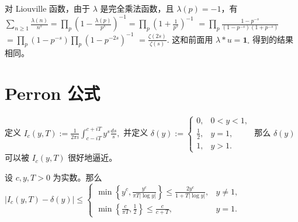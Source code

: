 \begin{example}
	对 Liouville 函数，由于 $\lambda$ 是完全乘法函数，且 $\lambda(p)=-1$，有
	\(\textstyle \sum_{n\geq\allowbreak{} 1}\frac{\lambda(n)}{n^s} =\allowbreak{} \prod_p\left(1-\frac{\lambda(p)}{p^s}\right)^{-1} =\allowbreak{} \prod_p\left(1+\allowbreak{}\frac1{p^s}\right)^{-1}\) \(\textstyle =\allowbreak{} \prod_p \frac{1-p^{-s}}{(1-p^{-s})(1+\allowbreak{}p^{-s})}\) \(\textstyle =\allowbreak{} \prod_p(1-p^{-s})\prod_p(1-p^{-2s})^{-1}\) \(\textstyle =\allowbreak{} \frac{\zeta(2s)}{\zeta(s)}.\)
	这和前面用 $\lambda*u=\mathbf 1_{\square}$ 得到的结果相同。
\end{example}

\section{Perron 公式}

定义
\(\textstyle I_c(y,\allowbreak{}T):=\allowbreak{} \frac1{2\pi i}\int_{c-iT}^{c+\allowbreak{}iT}y^s\frac{ds}{s},\allowbreak{}\)
并定义
\(\textstyle \delta(y):= \begin{cases} 0, & 0<y<1,\\ \frac12, & y=1,\\ 1, & y>1. \end{cases}\)
那么 $\delta(y)$ 可以被 $I_c(y,T)$ 很好地逼近。

\begin{lemma}[原文 Lemma 4.9]
	设 $c,y,T>0$ 为实数。那么
	\(\textstyle |I_c(y,T)-\delta(y)| \leq \begin{cases} \textstyle \min\left\{y^c,\frac{y^c}{\pi T|\log y|}\right\} \leq \textstyle\frac{2y^c}{1+T|\log y|}, & y\neq 1,\\ \textstyle \min\left\{\frac{c}{\pi T},\frac12\right\} \leq \textstyle\frac{c}{c+T}, & y=1. \end{cases}\)
\end{lemma}

